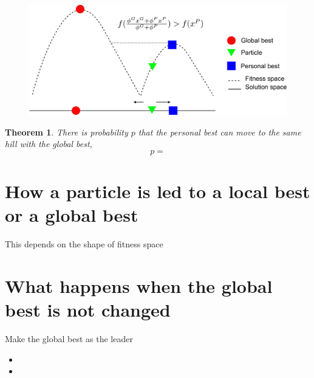 \documentclass[10pt,a4paper]{article}
\newtheorem{thm}{Theorem}
\begin{document}
\begin{figure}[tbph]
\centering
\includegraphics[width=0.7\linewidth]{./two_hills_case}
\caption{}
\label{fig:two_hills_case}
\end{figure}

\begin{thm}
There is probability $ p $ that the personal best can move to the same hill with the global best,
\begin{equation}
p = 
\end{equation}
\end{thm}

\section{How a particle is led to a local best or a global best}

This depends on the shape of fitness space

\section{What happens when the global best is not changed}

Make the global best as the leader

\begin{itemize}
\item 
\item 
\end{itemize}
\end{document}
